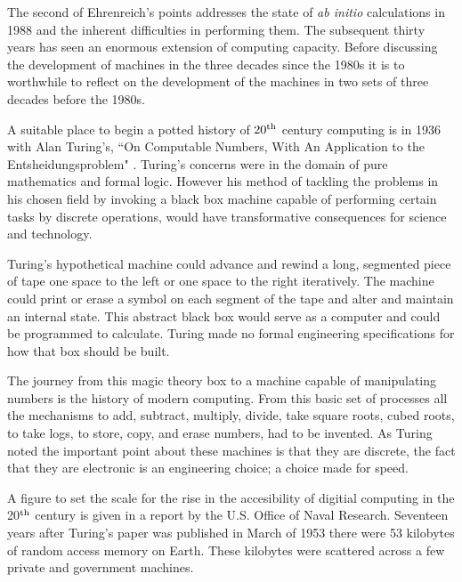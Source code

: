 The second of Ehrenreich's points addresses the state of
{\it ab initio} calculations in 1988 and the inherent 
difficulties in performing them. The subsequent thirty years 
has seen an enormous extension of computing capacity. 
Before discussing the development of machines in the three decades since the 1980s it
is to worthwhile to reflect on the development of the machines in two
sets of three decades before the 1980s. 


A suitable place to begin a potted history of $20^{\rm th}$
century computing is in 1936 with Alan Turing's, ``On Computable Numbers, 
With An Application to the Entsheidungsproblem"
\cite{turing36a}. Turing's concerns were in the domain of pure mathematics and
formal logic. However his method of tackling the problems in his chosen field by
invoking a black box machine capable of performing certain tasks by discrete operations,
would have transformative consequences for science and technology. 

Turing's hypothetical machine could advance and rewind a long,
segmented piece of tape one space to the left or one space to the right iteratively. 
The machine could print or erase a symbol on each segment of the tape and alter 
and maintain an internal state.
This abstract black box would serve as a computer and could be programmed 
to calculate. Turing made no formal engineering specifications for 
how that box should be built. 

The journey from this magic theory box to a machine capable of manipulating
numbers is the history of modern computing. From this basic set of processes
all the mechanisms to add, subtract, multiply, divide, take square roots, 
cubed roots, to take logs, to store, copy, and erase numbers, had to be 
invented. As Turing noted the important point about
these machines is that they are discrete, the fact that they are electronic
is an engineering choice; a choice made for speed.

A figure to set the scale for the rise in the accesibility of digitial computing 
in the 20$^{\rm th}$ century is given in a report
by the U.S. Office of Naval Research. Seventeen years after Turing's paper 
was published in March of 1953 there were 53 kilobytes of 
random access memory on Earth.\cite{dyson12, usonr53}
These kilobytes were scattered across a few private and government machines. 


